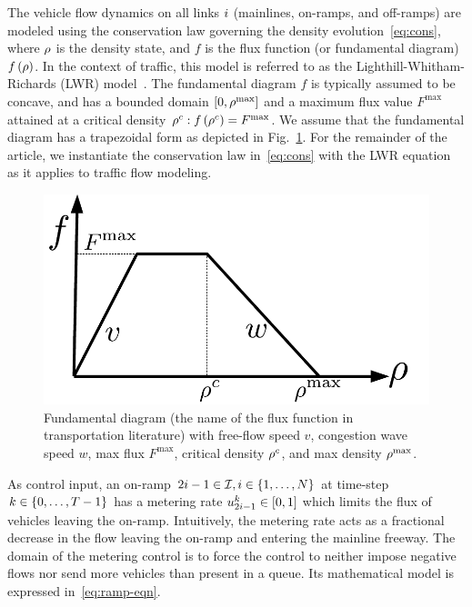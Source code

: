 				
		The vehicle flow dynamics on all links $i$ (mainlines, on-ramps,
		and off-ramps) are modeled using the conservation law governing the
		density evolution~\eqref{eq:cons}, where $\rho$ is the
		density state, and $f$ is the flux function (or fundamental diagram)
		$f\left(\rho\right)$. In the context of traffic, this model is
		referred to as the Lighthill-Whitham-Richards (LWR) model~\cite{lighthill1955kinematic,richards1956shock}.
		The fundamental diagram $f$ is typically assumed to be concave, and
		has a bounded domain $\left[0,\rho^{\max}\right]$ and a maximum
		flux value $F^{\max}$ attained at a critical density $\rho^{c}:f\left(\rho^{c}\right)=F^{\max}$.
		We assume that the fundamental diagram has a trapezoidal form as depicted
		in Fig.~\ref{fig:Fundamental-diagram-with}. For the remainder
		of the article, we instantiate the conservation law in~\eqref{eq:cons}
		with the LWR equation as it applies to traffic flow modeling.\begin{figure}%
		\begin{centering}
			\includegraphics[width=0.4\columnwidth]{figs-gen/fd}
			\par\end{centering}
						
			\caption{Fundamental diagram (the name of the flux function in transportation
				literature) with free-flow speed $v$, congestion wave speed $w$,
				max flux $F^{\max}$, critical density $\rho^{c}$, and max density
				$\rho^{\max}$.\label{fig:Fundamental-diagram-with}}
			\end{figure}%
						
						
			As control input, an on-ramp $2i-1\in\mathcal{I},i\in\left\{ 1,\ldots,N\right\}$
			at time-step $k\in\left\{ 0,\ldots,T-1\right\}$ has a metering rate $u_{2i-1}^{k}\in\left[0,1\right]$
			which limits the flux of vehicles leaving the on-ramp. Intuitively,
			the metering rate acts as a fractional decrease in the flow leaving
			the on-ramp and entering the mainline freeway. The domain of the metering
			control is to force the control to neither impose negative flows nor
			send more vehicles than present in a queue. Its mathematical model
			is expressed in~\eqref{eq:ramp-eqn}.
						
